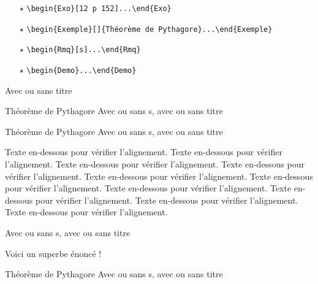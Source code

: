 \documentclass[12pt,french,oneside]{book}
\begin{document}
\begin{spacing}{1.2}
\begin{itemize}
\item[$\star$] \verb=\begin{Exo}[12 p 152]...\end{Exo}=\,

\item[$\star$] \verb=\begin{Exemple}[]{Théorème de Pythagore}...\end{Exemple}=\,

\item[$\star$] \verb=\begin{Rmq}[s]...\end{Rmq}=\,

\item[$\star$] \verb=\begin{Demo}...\end{Demo}=\,

\end{itemize}

\begin{Thm}
Avec ou sans titre
\end{Thm}

\begin{Prop}[s]{Théorème de Pythagore}
Avec ou sans s, avec ou sans titre
\end{Prop}


\begin{Defi}[]{Théorème de Pythagore}
Avec ou sans s, avec ou sans titre
\end{Defi}

Texte en-dessous pour vérifier l'alignement. 
Texte en-dessous pour vérifier l'alignement. 
Texte en-dessous pour vérifier l'alignement. 
Texte en-dessous pour vérifier l'alignement. 
Texte en-dessous pour vérifier l'alignement. 
Texte en-dessous pour vérifier l'alignement. 
Texte en-dessous pour vérifier l'alignement. 
Texte en-dessous pour vérifier l'alignement. 
Texte en-dessous pour vérifier l'alignement. 
Texte en-dessous pour vérifier l'alignement. 

\bigskip

\begin{Methode}[]{}
Avec ou sans s, avec ou sans titre
\end{Methode}

\begin{Exo}[12 p 152]
Voici un superbe énoncé !
\end{Exo}

\begin{Exemple}[]{Théorème de Pythagore}
Avec ou sans s, avec ou sans titre
\end{Exemple}


\end{spacing}
\end{document}
